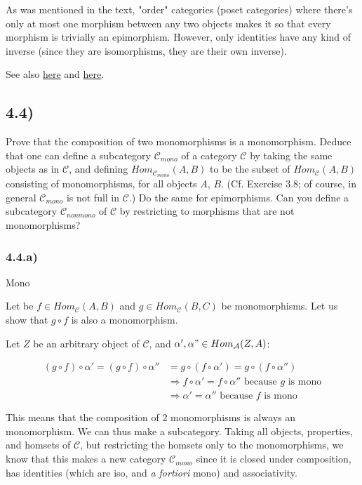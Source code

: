 \documentclass[12pt, letterpaper, twoside]{report}
\begin{document}
As was mentioned in the text, "order" categories (poset categories) where there's only at most one morphism between any two objects makes it so that every morphism is trivially an epimorphism. However, only identities have any kind of inverse (since they are isomorphisms, they are their own inverse).

See also \href{https://ncatlab.org/nlab/show/partial+order}{here} and \href{https://math.stackexchange.com/questions/81123/examples-of-categories-where-epimorphism-does-not-have-a-right-inverse-not-surj}{here}.



\subsection*{4.4)}

Prove that the composition of two monomorphisms is a monomorphism. Deduce that one can define a subcategory $\mathcal{C}_{mono}$ of a category $\mathcal{C}$ by taking the same objects as in $\mathcal{C}$, and defining $Hom_{\mathcal{C}_{mono}} (A, B)$ to be the subset of $Hom_\mathcal{C} (A, B)$ consisting of monomorphisms, for all objects $A$, $B$. (Cf. Exercise 3.8; of course, in general $\mathcal{C}_{mono}$ is not full in $\mathcal{C}$.) Do the same for epimorphisms. Can you define a subcategory $\mathcal{C}_{nonmono}$ of $\mathcal{C}$ by restricting to morphisms that are not monomorphisms?

\subsubsection*{4.4.a)} Mono

Let be $f \in Hom_{\mathcal{C}} (A, B)$ and $g \in Hom_{\mathcal{C}} (B, C)$ be monomorphisms. Let us show that $g \circ f$ is also a monomorphism.

Let $Z$ be an arbitrary object of $\mathcal{C}$, and $\alpha', \alpha" \in Hom_{\mathcal{A}} (Z, A)$:

$$
\begin{aligned}
	(g \circ f) \circ \alpha' = (g \circ f) \circ \alpha''
		& = g \circ (f \circ \alpha') = g \circ (f \circ \alpha'') \\
		& \Rightarrow f \circ \alpha' = f \circ \alpha'' \text{ because $g$ is mono} \\
		& \Rightarrow         \alpha' =         \alpha'' \text{ because $f$ is mono}
\end{aligned}
$$

This means that the composition of 2 monomorphisms is always an monomorphism. We can thus make a subcategory. Taking all objects, properties, and homsets of $\mathcal{C}$, but restricting the homsets only to the monomorphisms, we know that this makes a new category $\mathcal{C}_{mono}$ since it is closed under composition, has identities (which are iso, and \textit{a fortiori} mono) and associativity.
\end{document}
